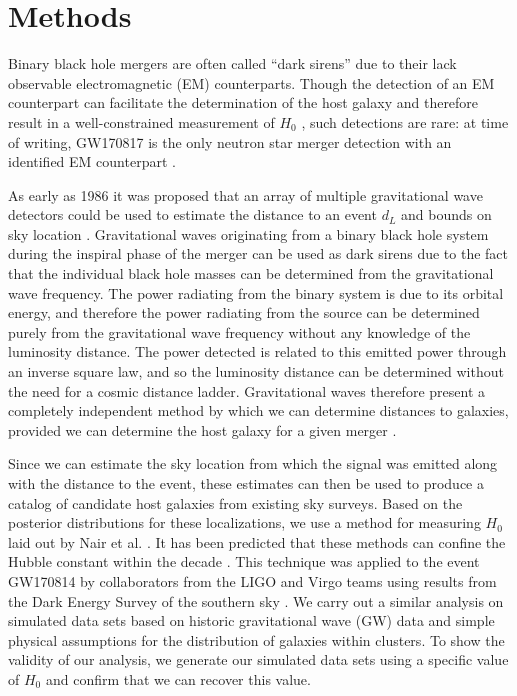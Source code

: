 \section{\label{sec:methods} Methods}


Binary black hole mergers are often called ``dark sirens'' due to their lack observable electromagnetic (EM) counterparts.
Though the detection of an EM counterpart can facilitate the determination of the host galaxy and therefore result in a well-constrained measurement of $H_0$ \cite{GW170817_H0}, such detections are rare: at time of writing, GW170817 is the only neutron star merger detection with an identified EM counterpart \cite{GW170817_announce}.

As early as 1986 it was proposed that an array of multiple gravitational wave detectors could be used to estimate the distance to an event $d_L$ and bounds on sky location \cite{Schutz_1986}.
Gravitational waves originating from a binary black hole system during the inspiral phase of the merger can be used as dark sirens due to the fact that the individual black hole masses can be determined from the gravitational wave frequency.
The power radiating from the binary system is due to its orbital energy, and therefore the power radiating from the source can be determined purely from the gravitational wave frequency without any knowledge of the luminosity distance.
The power detected is related to this emitted power through an inverse square law, and so the luminosity distance can be determined without the need for a cosmic distance ladder.
Gravitational waves therefore present a completely independent method by which we can determine distances to galaxies, provided we can determine the host galaxy for a given merger \cite{GW170814_DES,GW170817_H0,Nair_2018}.

Since we can estimate the sky location from which the signal was emitted along with the distance to the event, these estimates can then be used to produce a catalog of candidate host galaxies from existing sky surveys.
Based on the posterior distributions for these localizations, we use a method for measuring $H_0$ laid out by Nair et al. \cite{Nair_2018}.
It has been predicted that these methods can confine the Hubble constant within the decade \cite{Chen_2018}.
This technique was applied to the event GW170814 by collaborators from the LIGO and Virgo teams using results from the Dark Energy Survey of the southern sky \cite{GW170814_DES}.
We carry out a similar analysis on simulated data sets based on historic gravitational wave (GW) data and simple physical assumptions for the distribution of galaxies within clusters.
To show the validity of our analysis, we generate our simulated data sets using a specific value of $H_0$ and confirm that we can recover this value.

